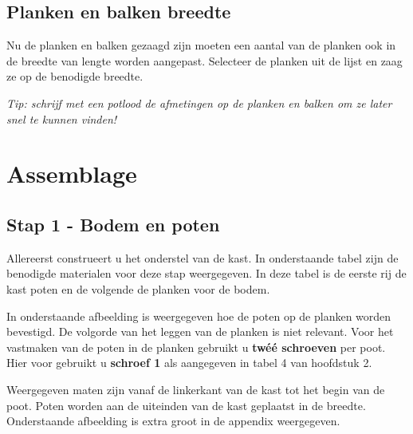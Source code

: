 \documentclass{article}
\begin{document}




\subsection{Planken en balken breedte}

Nu de planken en balken gezaagd zijn moeten een aantal van de planken ook in de breedte van lengte worden aangepast. Selecteer de planken uit de lijst en zaag ze op de benodigde breedte. \\

\begin{center}
    \textit{Tip: schrijf met een potlood de afmetingen op de planken en balken om ze later snel te kunnen vinden!}
\end{center}



\clearpage
\newpage

\section{Assemblage}

\subsection{Stap 1 - Bodem en poten}

Allereerst construeert u het onderstel van de kast. In onderstaande tabel zijn de benodigde materialen voor deze stap weergegeven. In deze tabel is de eerste rij de kast poten en de volgende de planken voor de bodem.



In onderstaande afbeelding is weergegeven hoe de poten op de planken worden bevestigd. De volgorde van het leggen van de planken is niet relevant. Voor het vastmaken van de poten in de planken gebruikt u \textbf{tw\'{e}\'{e} schroeven} per poot. Hier voor gebruikt u \textbf{schroef 1} als aangegeven in tabel 4 van hoofdstuk 2.

Weergegeven maten zijn vanaf de linkerkant van de kast tot het begin van de poot. Poten worden aan de uiteinden van de kast geplaatst in de breedte. Onderstaande afbeelding is extra groot in de appendix weergegeven.
\end{document}
